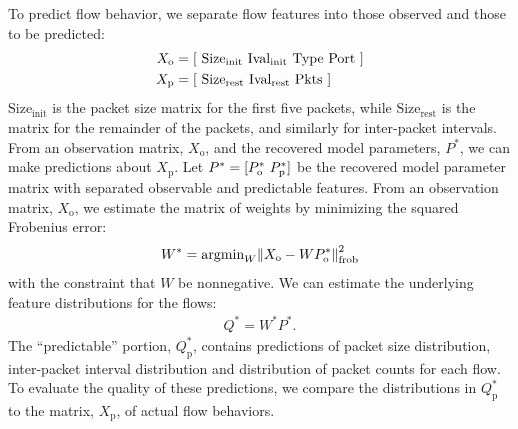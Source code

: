 \documentclass{acm_proc_article-sp}
\begin{document}
To predict flow behavior, we separate flow features into those observed and those to be predicted:
\begin{align}
  X_\text{o} &= {\left[ ~
    \text{Size}_\text{init} ~
    \text{Ival}_\text{init} ~
    \text{Type} ~
    \text{Port} ~
  \right]} \\
  X_\text{p} &= {\left[ ~
    \text{Size}_\text{rest} ~
    \text{Ival}_\text{rest} ~
    \text{Pkts} ~
  \right]}
\end{align}
$\text{Size}_\text{init}$ is the packet size matrix for the first five packets, while $\text{Size}_\text{rest}$ is the matrix for the remainder of the packets, and similarly for inter-packet intervals.
From an observation matrix, $X_\text{o}$, and the recovered model parameters, $P^*$, we can make predictions about $X_\text{p}$.
Let $P^* = {[P^*_\text{o}~P^*_\text{p}]}$ be the recovered model parameter matrix  with separated observable and predictable features.
From an observation matrix, $X_\text{o}$, we estimate the matrix of weights by minimizing the squared Frobenius error:
\begin{align}
  W^* = \text{argmin}_W {{\left\lVert X_\text{o} - W P^*_\text{o}\right\rVert}^2_\text{frob}}
\end{align}
with the constraint that $W$ be nonnegative.
We can estimate the underlying feature distributions for the flows:
\begin{align}
  Q^* = W^*P^*.
\end{align}
The ``predictable'' portion, $Q^*_\text{p}$, contains predictions of packet size distribution, inter-packet interval distribution and distribution of packet counts for each flow.
To evaluate the quality of these predictions, we compare the distributions in $Q^*_\text{p}$ to the matrix, $X_\text{p}$, of actual flow behaviors.
\end{document}
